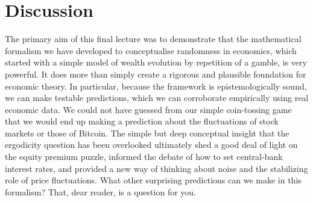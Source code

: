 \section{Discussion}
The primary aim of this final lecture was to demonstrate that the mathematical formalism we have developed to conceptualise randomness in economics, which started with a simple model of wealth evolution by repetition of a gamble, is very powerful. It does more than simply create a rigorous and plausible foundation for economic theory. In particular, because the framework is epistemologically sound, we can make testable predictions, which we can corroborate empirically using real economic data. We could not have guessed from our simple coin-tossing game that we would end up making a prediction about the fluctuations of stock markets or those of Bitcoin. The simple but deep conceptual insight that the ergodicity question has been overlooked ultimately shed a good deal of light on the equity premium puzzle, informed the debate of how to set central-bank interest rates, and provided a new way of thinking about noise and the stabilizing role of price fluctuations. What other surprising predictions can we make in this formalism? That, dear reader, is a question for you.

